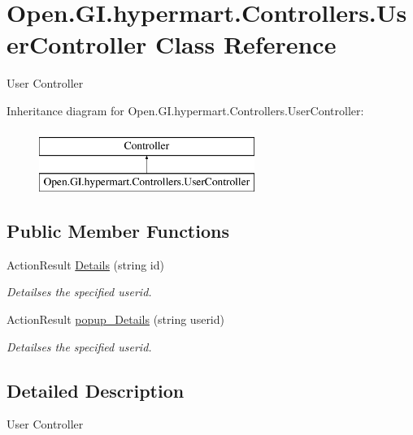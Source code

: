 \hypertarget{class_open_1_1_g_i_1_1hypermart_1_1_controllers_1_1_user_controller}{}\section{Open.\+G\+I.\+hypermart.\+Controllers.\+User\+Controller Class Reference}
\label{class_open_1_1_g_i_1_1hypermart_1_1_controllers_1_1_user_controller}


User Controller  


Inheritance diagram for Open.\+G\+I.\+hypermart.\+Controllers.\+User\+Controller\+:\begin{figure}[H]
\begin{center}
\leavevmode
\includegraphics[height=2.000000cm]{class_open_1_1_g_i_1_1hypermart_1_1_controllers_1_1_user_controller}
\end{center}
\end{figure}
\subsection*{Public Member Functions}
\begin{DoxyCompactItemize}
\item 
Action\+Result \hyperlink{class_open_1_1_g_i_1_1hypermart_1_1_controllers_1_1_user_controller_a4627a7a94b713760f00050bac936a54f}{Details} (string id)
\begin{DoxyCompactList}\small\item\em Detailses the specified userid. \end{DoxyCompactList}\item 
Action\+Result \hyperlink{class_open_1_1_g_i_1_1hypermart_1_1_controllers_1_1_user_controller_a3168162b86edbdbd30a593fa6aca8e9f}{popup\+\_\+\+Details} (string userid)
\begin{DoxyCompactList}\small\item\em Detailses the specified userid. \end{DoxyCompactList}\end{DoxyCompactItemize}


\subsection{Detailed Description}
User Controller 

